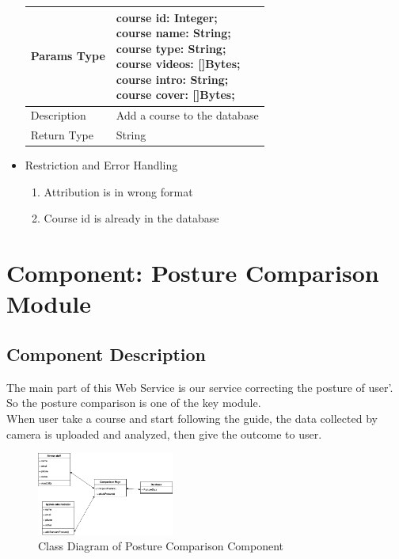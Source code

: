 \documentclass[16pt]{scrreprt}
\begin{document}
\begin{itemize}
\begin{center}
\begin{tabular}{p{5cm}p{10cm}}
        \hline
        Params Type & \makecell[l]{course id: Integer;\\course name: String;\\course type: String;\\course videos: []Bytes;\\course intro: String;\\course cover: []Bytes;\\}\\
        \hline
        Description & Add a course to the database\\
        \hline
        Return Type & String\\
        \hline
    \end{tabular}
\end{center}
\item Restriction and Error Handling\\
\begin{enumerate}
    \item Attribution is in wrong format
    \item Course id is already in the database
\end{enumerate} 
\end{itemize}

\section{Component: Posture Comparison Module}
\subsection{Component Description}
The main part of this Web Service is our service correcting the posture of user’. So the posture comparison is one of the key module. \\ 
When user take a course and start following the guide, the data collected by camera is uploaded and analyzed, then give the outcome to user.\\ 

\begin{figure}[H]
    \centering
    \includegraphics[width=0.4\textwidth]{diagrams/class-comparison.png}
    \caption{Class Diagram of Posture Comparison Component}
\end{figure}
\end{document}
